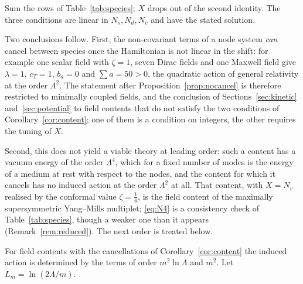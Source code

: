 \documentclass[11pt,a4paper]{article}
\makeatletter
\theoremstyle{stmt}
\theoremstyle{defn}
\theoremstyle{rmk}
\renewenvironment{proof}[1][\proofname]{\par\pushQED{\qed}\normalfont\topsep6\p@\@plus6\p@\relax
  \trivlist\item[\hskip\labelsep{\sffamily\itshape\small #1.}]\ignorespaces}{\popQED\endtrivlist\@endpefalse}
\numberwithin{equation}{section}
\makeatother
\begin{document}
\begin{proof}
Sum the rows of Table~\ref{tab:species}; $X$ drops out of the second identity. The three conditions are linear in $N_s,N_d,N_v$ and have the stated solution.
\end{proof}

Two conclusions follow. First, the non-covariant terms of a node system \emph{can} cancel between species once the Hamiltonian is not linear in the shift: for example one scalar field with $\zeta=1$, seven Dirac fields and one Maxwell field give $\lambda=1$, $c_T=1$, $b_a=0$ and $\sum a=50>0$, the quadratic action of general relativity at the order $\Lambda^2$. The statement after Proposition~\ref{prop:nocancel} is therefore restricted to minimally coupled fields, and the conclusion of Sections~\ref{sec:kinetic} and~\ref{sec:potential} to field contents that do not satisfy the two conditions of Corollary~\ref{cor:content}; one of them is a condition on integers, the other requires the tuning of $X$.

Second, this does not yield a viable theory at leading order: such a content has a vacuum energy of the order $\Lambda^4$, which for a fixed number of modes is the energy of a medium at rest with respect to the nodes, and the content for which it cancels has no induced action at the order $\Lambda^2$ at all. That content, with $X=N_v$ realised by the conformal value $\zeta=\tfrac16$, is the field content of the maximally supersymmetric Yang--Mills multiplet; \eqref{eq:N4} is a consistency check of Table~\ref{tab:species}, though a weaker one than it appears (Remark~\ref{rem:reduced}). The next order is treated below.

For field contents with the cancellations of Corollary~\ref{cor:content} the induced action is determined by the terms of order $m^2\ln\Lambda$ and $m^2$. Let $L_m=\ln(2\Lambda/m)$.
\end{document}
